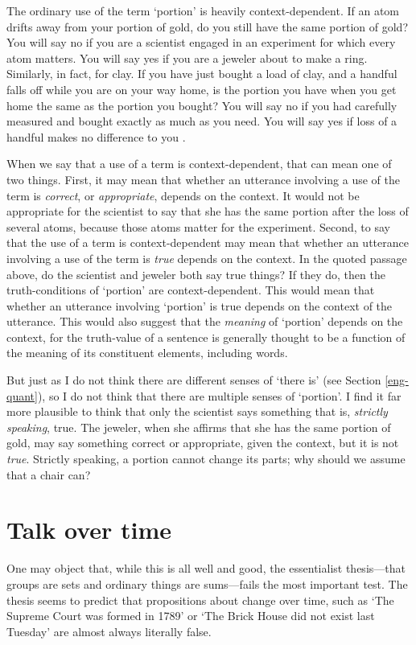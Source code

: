\documentclass[12pt,twoside]{reedfancy}
\newenvironment{squote}{%
	\begin{spacing}{1}
	\begin{list}{}{%
	\setlength{\labelwidth}{0pt}%
	\rightmargin\leftmargin%
	}
	\item\relax
	}{%
	\end{list}%
	\end{spacing}
	}
\begin{document}
\begin{spacing}{1.25}
\begin{squote}
The ordinary use of the term `portion' is heavily context-dependent.
If an atom drifts away from your portion of gold, do you still have
the same portion of gold?  You will say no if you are a scientist
engaged in an experiment for which every atom matters. You will say
yes if you are a jeweler about to make a ring.  Similarly, in fact,
for clay.  If you have just bought a load of clay, and a handful falls
off while you are on your way home, is the portion you have when you
get home the same as the portion you bought?  You will say no if you
had carefully measured and bought exactly as much as you need.  You
will say yes if loss of a handful makes no difference to you
\citeyearpar[163]{thomson1998a}.
\end{squote}

When we say that a use of a term is context-dependent, that can mean
one of two things.  First, it may mean that whether an utterance
involving a use of the term is {\em correct}, or {\em appropriate},
depends on the context.  It would not be appropriate for the scientist
to say that she has the same portion after the loss of several atoms,
because those atoms matter for the experiment.  Second, to say that
the use of a term is context-dependent may mean that whether an
utterance involving a use of the term is {\em true} depends on the
context.  In the quoted passage above, do the scientist and jeweler
both say true things?  If they do, then the truth-conditions of
`portion' are context-dependent.  This would mean that whether an
utterance involving `portion' is true depends on the context of the
utterance.  This would also suggest that the {\em meaning} of
`portion' depends on the context, for the truth-value of a sentence is
generally thought to be a function of the meaning of its constituent
elements, including words.

But just as I do not think there are different senses of `there is'
(see Section \ref{eng-quant}), so I do not think that there are
multiple senses of `portion'.  I find it far more plausible to think
that only the scientist says something that is, {\em strictly
  speaking}, true.  The jeweler, when she affirms that she has the
same portion of gold, may say something correct or appropriate, given
the context, but it is not {\em true}.  Strictly speaking, a portion
cannot change its parts; why should we assume that a chair can?

\section{Talk over time}
\label{time-talk}
One may object that, while this is all well and good, the essentialist
thesis---that groups are sets and ordinary things are sums---fails the
most important test.  The thesis seems to predict that propositions
about change over time, such as `The Supreme Court was formed in 1789'
or `The Brick House did not exist last Tuesday' are almost always
literally false.


\end{spacing}
\end{document}
